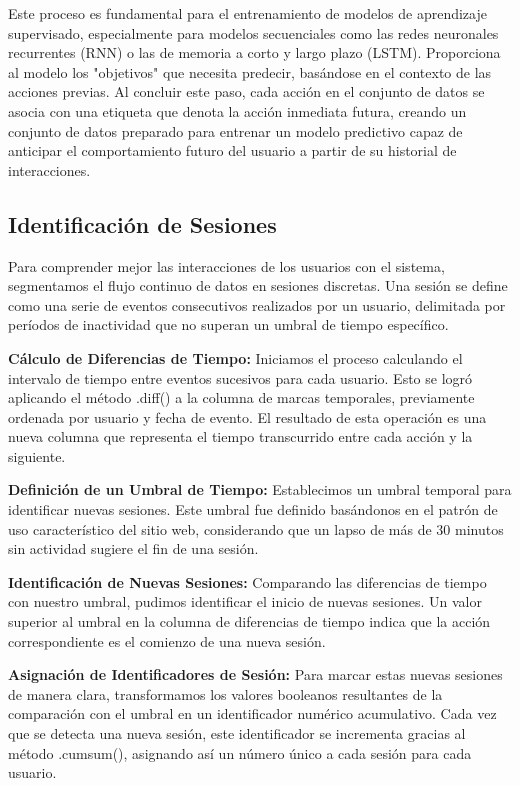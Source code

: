 Este proceso es fundamental para el entrenamiento de modelos de aprendizaje supervisado, especialmente para modelos secuenciales como las redes neuronales recurrentes (RNN) o las de memoria a corto y largo plazo (LSTM). Proporciona al modelo los "objetivos" que necesita predecir, basándose en el contexto de las acciones previas. Al concluir este paso, cada acción en el conjunto de datos se asocia con una etiqueta que denota la acción inmediata futura, creando un conjunto de datos preparado para entrenar un modelo predictivo capaz de anticipar el comportamiento futuro del usuario a partir de su historial de interacciones.

\subsection{Identificación de Sesiones}

Para comprender mejor las interacciones de los usuarios con el sistema, segmentamos el flujo continuo de datos en sesiones discretas. Una sesión se define como una serie de eventos consecutivos realizados por un usuario, delimitada por períodos de inactividad que no superan un umbral de tiempo específico.

\textbf{Cálculo de Diferencias de Tiempo:} Iniciamos el proceso calculando el intervalo de tiempo entre eventos sucesivos para cada usuario. Esto se logró aplicando el método .diff() a la columna de marcas temporales, previamente ordenada por usuario y fecha de evento. El resultado de esta operación es una nueva columna que representa el tiempo transcurrido entre cada acción y la siguiente.

\textbf{Definición de un Umbral de Tiempo:} Establecimos un umbral temporal para identificar nuevas sesiones. Este umbral fue definido basándonos en el patrón de uso característico del sitio web, considerando que un lapso de más de 30 minutos sin actividad sugiere el fin de una sesión.

\textbf{Identificación de Nuevas Sesiones:} Comparando las diferencias de tiempo con nuestro umbral, pudimos identificar el inicio de nuevas sesiones. Un valor superior al umbral en la columna de diferencias de tiempo indica que la acción correspondiente es el comienzo de una nueva sesión.

\textbf{Asignación de Identificadores de Sesión:} Para marcar estas nuevas sesiones de manera clara, transformamos los valores booleanos resultantes de la comparación con el umbral en un identificador numérico acumulativo. Cada vez que se detecta una nueva sesión, este identificador se incrementa gracias al método .cumsum(), asignando así un número único a cada sesión para cada usuario.

